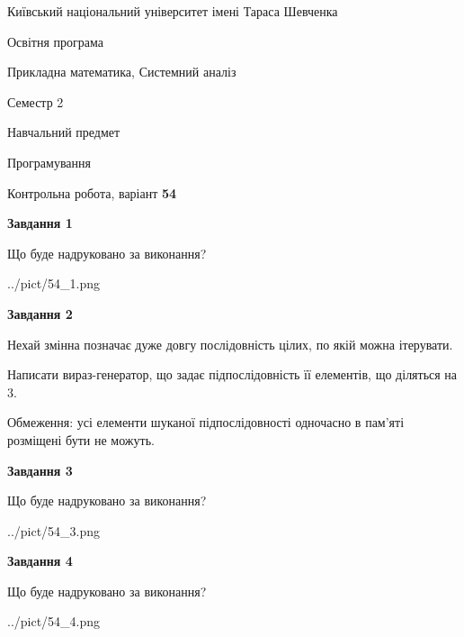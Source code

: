 \documentclass[12pt, ukrainian]{article}
\begin{document}
{{\begin {small}\par
{ \center  Київський національний університет імені Тараса Шевченка \par}
{\parbox {5 cm}{Освітня програма \hfill}{\parbox {8 cm}{Прикладна математика, Системний аналіз \hfill}}\parbox {5 cm}{\hfill Семестр 2}}\par
{\parbox {5 cm} {Навчальний предмет \hfill}\parbox {7 cm}{Програмування \hfill}\parbox {6cm}{\hfill}\par}\vspace{-7pt} \end{small}}{\center Контрольна робота, варіант  \No \textbf
{ 54 }\par}}
{
\begin {large}
{\begin {center}\textbf{Завдання 1}\end {center}}\par
Що буде надруковано за виконання?\par\par
\begin{center}
	{../pict/54_1.png}
\end{center}
\newpage

{\begin {center}\textbf{Завдання 2}\end {center}}\par
Нехай змінна  позначає дуже довгу послідовність цілих, по якій можна ітерувати.

Написати вираз-генератор, що задає підпослідовність її елементів, що діляться на 3.

Обмеження: усі елементи шуканої підпослідовності одночасно в пам'яті розміщені бути не можуть.\par
\newpage

{\begin {center}\textbf{Завдання 3}\end {center}}\par
Що буде надруковано за виконання?
\begin{center}
	{../pict/54_3.png}
\end{center}
\newpage

{\begin {center}\textbf{Завдання 4}\end {center}}\par
Що буде надруковано за виконання?\par
\begin{center}
	{../pict/54_4.png}
\end{center}
\newpage


\end{large}}
\end{document}
